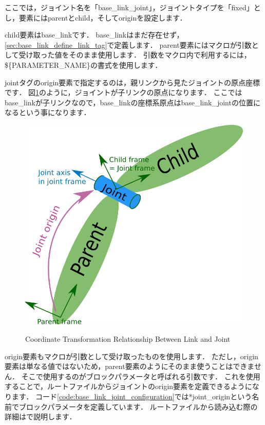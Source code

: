 \documentclass[{../../master}]{subfiles}
\begin{document}
ここでは，ジョイント名を「\textsf{base\_link\_joint}」，ジョイントタイプを「\textsf{fixed}」とし，要素には\textsf{parent}と\textsf{child}，そして\textsf{origin}を設定します．

\textsf{child}要素は\textsf{base\_link}です．
\textsf{base\_link}はまだ存在せず，\ref{sec:base_link_define_link_tag}で定義します．
\textsf{parent}要素にはマクロが引数として受け取った値をそのまま使用します．
引数をマクロ内で利用するには，\textsf{\$\{\<PARAMETER\_NAME\>\}}の書式を使用します．

\textsf{joint}タグの\textsf{origin}要素で指定するのは，親リンクから見たジョイントの原点座標です．
図\ref{fig:joint}のように，ジョイントが子リンクの原点になります．
ここでは\textsf{base\_link}が子リンクなので，\textsf{base\_link}の座標系原点は\textsf{base\_link\_joint}の位置になるという事になります．

\begin{figure}[ht]
  \centering
  \includegraphics[width=100truemm, clip]{images/joint.png}
  \label{fig:joint}
  \caption{Coordinate Transformation Relationship Between Link and Joint\cite{urdf_xml_joint}}
\end{figure}

\textsf{origin}要素もマクロが引数として受け取ったものを使用します．
ただし，\textsf{origin}要素は単なる値ではないため，\textsf{parent}要素のようにそのまま使うことはできません．
そこで使用するのがブロックパラメータと呼ばれる引数です．
これを使用することで，ルートファイルからジョイントの\textsf{origin}要素を定義できるようになります．
コード\ref{code:base_link_joint_configuration}では\textsf{*joint\_origin}という名前でブロックパラメータを定義しています．
ルートファイルから読み込む際の詳細は\label{sec:base_link_include}で説明します．
\end{document}
